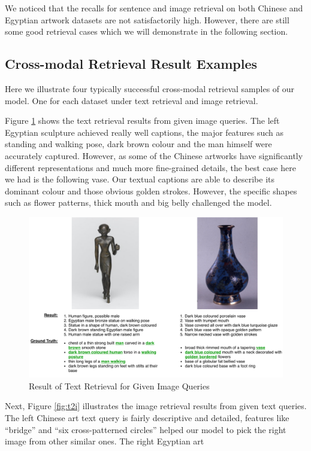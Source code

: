 We noticed that the recalls for sentence and image retrieval on both Chinese and Egyptian artwork datasets are not satisfactorily high. However, there are still some good retrieval cases which we will demonstrate in the following section.

\subsection{Cross-modal Retrieval Result Examples}
Here we illustrate four typically successful cross-modal retrieval samples of our model. One for each dataset under text retrieval and image retrieval. 

Figure \ref{fig:i2t} shows the text retrieval results from given image queries. The left Egyptian sculpture achieved really well captions, the major features such as standing and walking pose, dark brown colour and the man himself were accurately captured. However, as some of the Chinese artworks have significantly different representations and much more fine-grained details, the best case here we had is the following vase. Our textual captions are able to describe its dominant colour and those obvious golden strokes. However, the specific shapes such as flower patterns, thick mouth and big belly challenged the model.

\begin{figure}[h!]
\centering
\includegraphics[width=\textwidth]{i2t.pdf}
\caption{Result of Text Retrieval for Given Image Queries}
\label{fig:i2t}
\end{figure}

Next, Figure \ref{fig:t2i} illustrates the image retrieval results from given text queries. The left Chinese art text query is fairly descriptive and detailed, features like ``bridge'' and ``six cross-patterned circles'' helped our model to pick the right image from other similar ones. The right Egyptian art 

